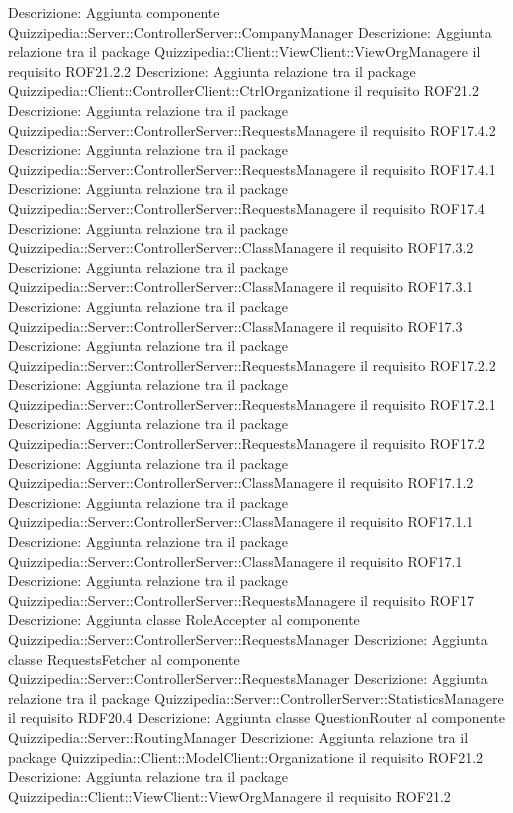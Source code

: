 Descrizione: Aggiunta componente Quizzipedia::Server::ControllerServer::CompanyManager 
Descrizione: Aggiunta relazione tra il package Quizzipedia::Client::ViewClient::ViewOrgManagere il requisito ROF21.2.2 
Descrizione: Aggiunta relazione tra il package Quizzipedia::Client::ControllerClient::CtrlOrganizatione il requisito ROF21.2 
Descrizione: Aggiunta relazione tra il package Quizzipedia::Server::ControllerServer::RequestsManagere il requisito ROF17.4.2 
Descrizione: Aggiunta relazione tra il package Quizzipedia::Server::ControllerServer::RequestsManagere il requisito ROF17.4.1 
Descrizione: Aggiunta relazione tra il package Quizzipedia::Server::ControllerServer::RequestsManagere il requisito ROF17.4 
Descrizione: Aggiunta relazione tra il package Quizzipedia::Server::ControllerServer::ClassManagere il requisito ROF17.3.2 
Descrizione: Aggiunta relazione tra il package Quizzipedia::Server::ControllerServer::ClassManagere il requisito ROF17.3.1 
Descrizione: Aggiunta relazione tra il package Quizzipedia::Server::ControllerServer::ClassManagere il requisito ROF17.3 
Descrizione: Aggiunta relazione tra il package Quizzipedia::Server::ControllerServer::RequestsManagere il requisito ROF17.2.2 
Descrizione: Aggiunta relazione tra il package Quizzipedia::Server::ControllerServer::RequestsManagere il requisito ROF17.2.1 
Descrizione: Aggiunta relazione tra il package Quizzipedia::Server::ControllerServer::RequestsManagere il requisito ROF17.2 
Descrizione: Aggiunta relazione tra il package Quizzipedia::Server::ControllerServer::ClassManagere il requisito ROF17.1.2 
Descrizione: Aggiunta relazione tra il package Quizzipedia::Server::ControllerServer::ClassManagere il requisito ROF17.1.1 
Descrizione: Aggiunta relazione tra il package Quizzipedia::Server::ControllerServer::ClassManagere il requisito ROF17.1 
Descrizione: Aggiunta relazione tra il package Quizzipedia::Server::ControllerServer::RequestsManagere il requisito ROF17 
Descrizione: Aggiunta classe RoleAccepter al componente Quizzipedia::Server::ControllerServer::RequestsManager 
Descrizione: Aggiunta classe RequestsFetcher al componente Quizzipedia::Server::ControllerServer::RequestsManager 
Descrizione: Aggiunta relazione tra il package Quizzipedia::Server::ControllerServer::StatisticsManagere il requisito RDF20.4 
Descrizione: Aggiunta classe QuestionRouter al componente Quizzipedia::Server::RoutingManager 
Descrizione: Aggiunta relazione tra il package Quizzipedia::Client::ModelClient::Organizatione il requisito ROF21.2 
Descrizione: Aggiunta relazione tra il package Quizzipedia::Client::ViewClient::ViewOrgManagere il requisito ROF21.2 
